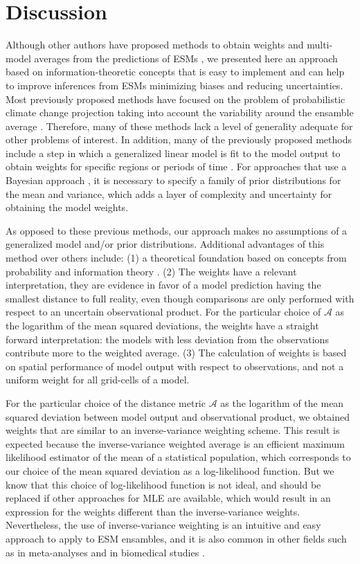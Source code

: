 \documentclass[gmd, manuscript]{copernicus}
\begin{document}
\section{Discussion}
Although other authors have proposed methods to obtain weights and multi-model averages from the predictions of ESMs \citep[and references therein]{Tebaldi2007, Merrifield2020}, we presented here an approach based on information-theoretic concepts that is easy to implement and can help to improve inferences from ESMs minimizing biases and reducing uncertainties. 
Most previously proposed methods have focused on the problem of probabilistic climate change projection taking into account the variability around the ensamble average \citep{Giorgi2002, Giorgi2003, Tebaldi2005, Knutti2017}. Therefore, many of these methods lack a level of generality adequate for other problems of interest. In addition, many of the previously proposed methods include a step in which a generalized linear model is fit to the model output to obtain weights for specific regions or periods of time \citep{Greene2006}. For approaches that use a Bayesian approach \citep[e.g.][]{Tebaldi2005}, it is necessary to specify a family of prior distributions for the mean and variance, which adds a layer of complexity and uncertainty for obtaining the model weights.  

As opposed to these previous methods, our approach makes no assumptions of a generalized model and/or prior distributions. 
Additional advantages of this method over others include: (1) a theoretical foundation based on concepts from probability and information theory \citep{Akaike1974, Akaike1981, Anderson2007, Burnham2002}. (2) The weights have a relevant interpretation, they are evidence in favor of a model prediction having the smallest distance to full reality, even though comparisons are only performed with respect to an uncertain observational product. For the particular choice of $\mathcal{A}$ as the logarithm of the mean squared deviations, the weights have a straight forward interpretation: the models with less deviation from the observations contribute more to the weighted average. 
(3) The calculation of weights is based on spatial performance of model output with respect to observations, and not a uniform weight for all grid-cells of a model.

For the particular choice of the distance metric $\mathcal{A}$ as the logarithm of the mean squared deviation between model output and observational product, we obtained weights that are similar to an inverse-variance weighting scheme. This result is expected because the inverse-variance weighted average is an efficient maximum likelihood estimator of the mean of a statistical population, which corresponds to our choice of the mean squared deviation as a log-likelihood function. But we know that this choice of log-likelihood function is not ideal, and should be replaced if other approaches for MLE are available, which would result in an expression for the weights different than the inverse-variance weights. Nevertheless, the use of inverse-variance weighting is an intuitive and easy approach to apply to ESM ensambles, and it is also common in other fields such as in meta-analyses \citep{Hartung2008, Kanters2022} and in biomedical studies \citep{Mansournia2016}. 
\end{document}
